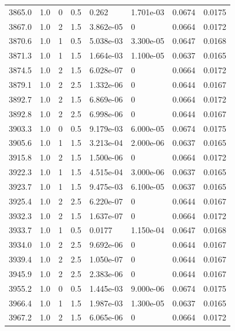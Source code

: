 \documentclass[preview]{standalone}
\begin{document}
{{{{{{{{{{{{{{\begin{tabular}{L{1.2cm}C{1.2cm} C{0.3cm}C{0.5cm} C{1.4cm}C{1.4cm} C{1.4cm}C{1.4cm}}
  3865.0  &   1.0  & 0     & 0.5 &  0.262  & 1.701e-03  & 0.0674 &  0.0175   \\ 
  3867.0  &   1.0  & 2     & 1.5 &  3.862e-05  & 0  & 0.0664 &  0.0172   \\ 
  3870.6  &   1.0  & 1     & 0.5 &  5.038e-03  & 3.300e-05  & 0.0647 &  0.0168   \\ 
  3871.3  &   1.0  & 1     & 1.5 &  1.664e-03  & 1.100e-05  & 0.0637 &  0.0165   \\ 
  3874.5  &   1.0  & 2     & 1.5 &  6.028e-07  & 0  & 0.0664 &  0.0172   \\ 
  3879.1  &   1.0  & 2     & 2.5 &  1.332e-06  & 0  & 0.0644 &  0.0167   \\ 
  3892.7  &   1.0  & 2     & 1.5 &  6.869e-06  & 0  & 0.0664 &  0.0172   \\ 
  3892.8  &   1.0  & 2     & 2.5 &  6.998e-06  & 0  & 0.0644 &  0.0167   \\ 
  3903.3  &   1.0  & 0     & 0.5 &  9.179e-03  & 6.000e-05  & 0.0674 &  0.0175   \\ 
  3905.6  &   1.0  & 1     & 1.5 &  3.213e-04  & 2.000e-06  & 0.0637 &  0.0165   \\ 
  3915.8  &   1.0  & 2     & 1.5 &  1.500e-06  & 0  & 0.0664 &  0.0172   \\ 
  3922.3  &   1.0  & 1     & 1.5 &  4.515e-04  & 3.000e-06  & 0.0637 &  0.0165   \\ 
  3923.7  &   1.0  & 1     & 1.5 &  9.475e-03  & 6.100e-05  & 0.0637 &  0.0165   \\ 
  3925.4  &   1.0  & 2     & 2.5 &  6.220e-07  & 0  & 0.0644 &  0.0167   \\ 
  3932.3  &   1.0  & 2     & 1.5 &  1.637e-07  & 0  & 0.0664 &  0.0172   \\ 
  3933.7  &   1.0  & 1     & 0.5 &  0.0177  & 1.150e-04  & 0.0647 &  0.0168   \\ 
  3934.0  &   1.0  & 2     & 2.5 &  9.692e-06  & 0  & 0.0644 &  0.0167   \\ 
  3939.4  &   1.0  & 2     & 2.5 &  1.050e-07  & 0  & 0.0644 &  0.0167   \\ 
  3945.9  &   1.0  & 2     & 2.5 &  2.383e-06  & 0  & 0.0644 &  0.0167   \\ 
  3955.2  &   1.0  & 0     & 0.5 &  1.445e-03  & 9.000e-06  & 0.0674 &  0.0175   \\ 
  3966.4  &   1.0  & 1     & 1.5 &  1.987e-03  & 1.300e-05  & 0.0637 &  0.0165   \\ 
  3967.2  &   1.0  & 2     & 1.5 &  6.065e-06  & 0  & 0.0664 &  0.0172   \\ 

\end{tabular}}}}}}}}}}}}}}}
\end{document}
